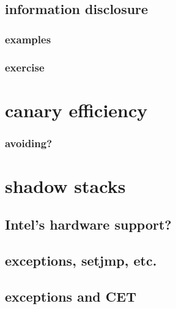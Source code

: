 

\subsection{information disclosure}
\subsubsection{examples}




\subsubsection{exercise}


\section{canary efficiency}


\subsubsection{avoiding?}


\section{shadow stacks}


\subsection{Intel's hardware support?}


\subsection{exceptions, setjmp, etc.}


\subsection{exceptions and CET}


